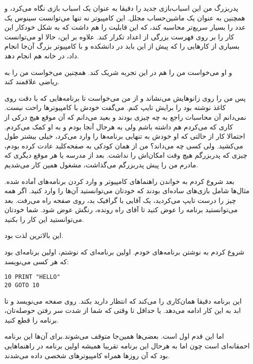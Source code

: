 پدربزرگ من این اسباب‌بازی جدید را دقیقا به عنوان یک اسباب بازی نگاه
می‌کرد، و همچنین به عنوان یک ماشین‌حساب مجلل. این کامپیوتر نه تنها
می‌توانست سینوس یک عدد را بسیار سریع‌تر محاسبه کند، که این قابلیت را هم
داشت که به شکل خودکار این کار را بر روی فهرست بزرگی از اعداد تکرار
کند. علاوه بر این، حالا او می‌توانست بسیاری از کارهایی را که پیش از این
باید در دانشکده و با کامپیوتر بزرگ آن‌جا انجام ‌داد، در خانه هم انجام
دهد.

و او می‌خواست من را هم در این تجربه شریک کند. همچنین می‌خواست من را به
ریاضی علاقمند کند.

پس من را روی زانو‌هایش می‌نشاند و از من می‌خواست تا برنامه‌هایی که با دقت
روی کاغذ نوشته بود را برایش تایپ کنم. می‌گفت خودش با کامپیوترها راحت
نیست. نمی‌دانم آن محاسبات راجع به چه چیزی بودند و بعید می‌دانم که آن
موقع هیچ درکی از کاری که می‌کردم هم داشته باشم ولی به هرحال آنجا بودم و
به او کمک می‌کردم. احتمالا کار از حالتی که او خودش به تنهایی برنامه‌ها
را وارد می‌کرد، خیلی بیشتر طول می‌کشید. ولی کسی چه می‌داند؟ من از همان
کودکی به صفحه‌کلید عادت کرده بودم، چیزی که پدربزرگم هیچ وقت امکان‌اش را
نداشت. بعد از مدرسه یا هر موقع دیگری که مادرم من را پیش پدربزرگم
می‌گذاشت، مشغول همین کار می‌شدیم.

بعد شروع کردم به خواندن راهنماهای کامپیوتر و وارد کردن برنامه‌های آماده
شده. مثال‌ها شامل بازی‌های ساده‌ای بودند که خودتان می‌توانستید آن‌ها را
وارد کنید. اگر همه چیز را درست تایپ می‌کردید، یک آقایی با گرافیک بد،
روی صفحه راه می‌رفت. بعد می‌توانستید برنامه را عوض کنید تا آقای راه
رونده، رنگش عوض شود. شما خودتان می‌توانستید این کار را بکنید.

این بالاترین لذت بود.

شروع کردم به نوشتن برنامه‌های خودم. اولین برنامه‌ای که نوشتم، اولین
برنامه‌ای بود که هر کسی می‌نویسد:

\begin{latin}
\begin{lstlisting}
10 PRINT "HELLO"
20 GOTO 10
\end{lstlisting}
\end{latin}

این برنامه دقیقا همان‌کاری را می‌کند که انتظار دارید بکند. روی صفحه
می‌نویسد  و تا ابد به این کار ادامه می‌دهد. یا حداقل تا وقتی که
شما از شدت سر رفتن حوصله‌تان، برنامه را قطع کنید.

اما این قدم اول است. بعضی‌ها همین‌جا متوقف می‌شوند.برای آن‌ها این برنامه
احمقانه‌ای است چون  اما به هرحال این برنامه تقریبا همیشه اولین
برنامه در راهنماهایی بود که آن روزها همراه کامپیوترهای شخصی داده
می‌شدند.

